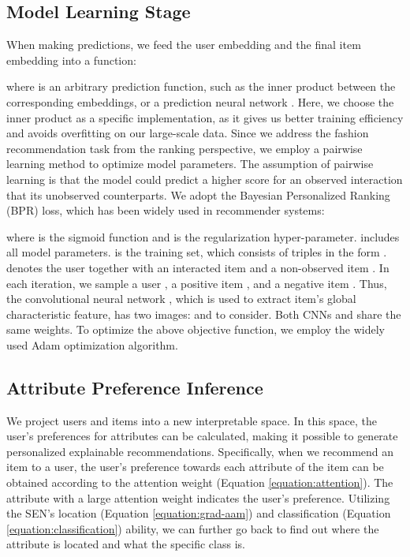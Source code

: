 \documentclass{article}
\begin{document}
\subsection{Model Learning Stage}
When making predictions, we feed the user embedding  and the final item embedding  into a function:

where  is an arbitrary prediction function, such as the inner product between the corresponding embeddings, or a prediction neural network \cite{he2017neural}. Here, we choose the inner product  as a specific implementation, as it gives us better training efficiency and avoids overfitting on our large-scale data.
Since we address the fashion recommendation task from the ranking perspective, we employ a pairwise learning method to optimize model parameters. The assumption of pairwise learning is that the model could predict a higher score for an observed interaction that its unobserved counterparts. We adopt the Bayesian Personalized Ranking (BPR) \cite{rendle2009bpr} loss, which has been widely used in recommender systems:

where  is the sigmoid function and  is the regularization hyper-parameter.  includes all model parameters.  is the training set, which consists of triples in the form .  denotes the user together with an interacted item  and a non-observed item . In each iteration, we sample a user , a positive item , and a negative item . Thus, the convolutional neural network , which is used to extract item's global characteristic feature, has two images:  and  to consider. Both CNNs  and  share the same weights. To optimize the above objective function, we employ the widely used Adam \cite{kingma2014adam} optimization algorithm. 


\subsection{Attribute Preference Inference} \label{ssec:explanation}
We project users and items into a new interpretable space. In this space, the user's preferences for attributes can be calculated, making it possible to generate personalized explainable recommendations. Specifically, when we recommend an item to a user, the user’s preference towards each attribute of the item can be obtained according to the attention weight (Equation \ref{equation:attention}). The attribute with a large attention weight indicates the user's preference. Utilizing the SEN’s location (Equation \ref{equation:grad-aam}) and classification (Equation \ref{equation:classification}) ability, we can further go back to find out where the attribute is located and what the specific class is. 
\end{document}
